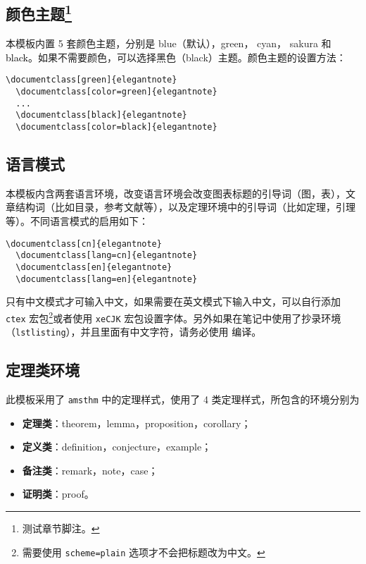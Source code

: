 \documentclass[cn,geye,blue,14pt,normal]{elegantnote}
\begin{document}
\subsection[颜色主题]{颜色主题\footnote{测试章节脚注。}}

本模板内置 5 套颜色主题，分别是 \textcolor{eblue}{blue}（默认），\textcolor{egreen}{green}， \textcolor{ecyan}{cyan}， \textcolor{sakura}{sakura} 和 \textcolor{black}{black}。如果不需要颜色，可以选择黑色（black）主题。颜色主题的设置方法：
\begin{lstlisting}[frame=none]  
  \documentclass[green]{elegantnote}
  \documentclass[color=green]{elegantnote}
  ...
  \documentclass[black]{elegantnote}
  \documentclass[color=black]{elegantnote}
\end{lstlisting}


\subsection{语言模式}

本模板内含两套语言环境，改变语言环境会改变图表标题的引导词（图，表），文章结构词（比如目录，参考文献等），以及定理环境中的引导词（比如定理，引理等）。不同语言模式的启用如下：
\begin{lstlisting}[frame=none]  
  \documentclass[cn]{elegantnote} 
  \documentclass[lang=cn]{elegantnote} 
  \documentclass[en]{elegantnote} 
  \documentclass[lang=en]{elegantnote}
\end{lstlisting}

\begin{note}
  只有中文模式才可输入中文，如果需要在英文模式下输入中文，可以自行添加 \lstinline{ctex} 宏包\footnote{需要使用 \lstinline{scheme=plain} 选项才不会把标题改为中文。}或者使用 \lstinline{xeCJK} 宏包设置字体。另外如果在笔记中使用了抄录环境（\lstinline{lstlisting}），并且里面有中文字符，请务必使用  编译。
\end{note}


\subsection{定理类环境}

此模板采用了 \lstinline{amsthm} 中的定理样式，使用了 4 类定理样式，所包含的环境分别为
\begin{itemize}
  \item \textbf{定理类}：theorem，lemma，proposition，corollary；
  \item \textbf{定义类}：definition，conjecture，example；
  \item \textbf{备注类}：remark，note，case；
  \item \textbf{证明类}：proof。
\end{itemize}
\end{document}
